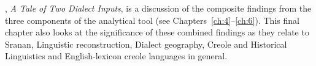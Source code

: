 , \emph{A Tale of Two Dialect Inputs}, is a discussion of the composite findings from the three components of the analytical tool (see Chapters~\ref{ch:4}--\ref{ch:6}). This final chapter also looks at the significance of these combined findings as they relate to Sranan, Linguistic reconstruction, Dialect geography, Creole and Historical Linguistics and English-lexicon creole languages in general.
